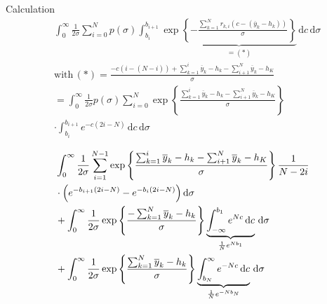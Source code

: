 \documentclass{beamer}
\newcommand{\y}{\overline{y}}
\newcommand{\dx}{\, \mathrm{d}}
\begin{document}
	\begin{frame}{Calculation}
		\begin{align}
    		&\int_0^{\infty} \frac{1}{2\sigma} \sum_{i = 0}^N p(\sigma) \int_{b_i}				^{b_{i+1}} \exp \underbrace{\left\{-\frac{\sum_{k = 1}^N r_{k, i} (c - 			(\y_k - h_k))}{\sigma} \right\}}_{= (*)} \dx c \dx\sigma \\
    		&\text{with} \, (*) = \frac{-c (i - (N -i)) + \sum_{k = 1}^i \y_k - 				h_k - \sum_{i + 1}^N \y_k - h_K}{\sigma} \\
    		&= \int_0^\infty \frac{1}{2\sigma} p(\sigma) \sum_{i = 0}^N \exp \left				\{\frac{\sum_{k = 1}^i \y_k - h_k - \sum_{i + 1}^N \y_k - h_K}{\sigma}				\right\} \\ \
    		&\cdot \int_{b_i}^{b_{i + 1}} e^{-c(2i -N)} \dx c \dx \sigma
		\end{align}
	\end{frame}
	
	\begin{frame}
		\begin{align}
    & \int_0^\infty \frac{1}{2\sigma} \sum_{i = 1}^{N - 1} \exp \left\{\frac{\sum_{k = 1}^i \y_k - h_k - \sum_{i + 1}^N \y_k - h_K}{\sigma}\right\} \frac{1}{N - 2i} \\
    & \cdot \Bigl(e^{-b_{i + 1}(2i - N)} - e^{-b_i(2i - N)} \Bigr) \dx \sigma  \\
    & + \int_0^\infty \frac{1}{2\sigma} \exp\left\{\frac{-\sum_{k = 1}^N \y_k - h_k}{\sigma} \right\} \underbrace{\int_{-\infty}^{b_1} e^{Nc} \dx c}_{\frac{1}{N}e^{N b_1}} \dx \sigma \\
    &+ \int_0^\infty \frac{1}{2\sigma} \exp\left\{\frac{\sum_{k = 1}^N \y_k - h_k}{\sigma} \right\} \underbrace{\int_{b_N}^{\infty} e^{-Nc} \dx c}_{\frac{1}{N}e^{-N b_N}} \dx \sigma
\end{align}
	\end{frame}
	
\end{document}

